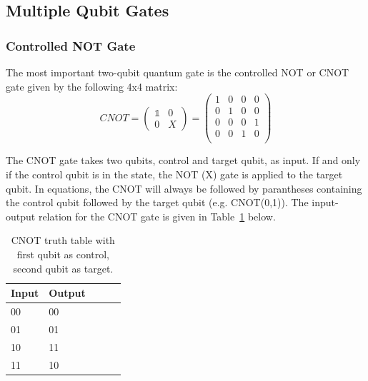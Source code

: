 

\subsection{Multiple Qubit Gates}
\label{subsubsec:multiqubitgates}

\subsubsection{Controlled NOT Gate}
\label{subsubsubsec:cnotgate}

The most important two-qubit quantum gate is the controlled NOT or CNOT gate given by the following 4x4 matrix:
\begin{equation}
CNOT = \begin{pmatrix}
 \mathbb{1} & 0 \\ 
 0 & X
 \end{pmatrix} = \begin{pmatrix}
 1 & 0 & 0 & 0 \\ 
 0 & 1 & 0 & 0 \\
 0 & 0 & 0 & 1 \\
 0 & 0 & 1 & 0 \\
 \end{pmatrix}
\end{equation}

The CNOT gate takes two qubits, control and target qubit, as input. If and only if the control qubit is in the \1 state, the NOT (X) gate is applied to the target qubit. In equations, the CNOT will always be followed by parantheses containing the control qubit followed by the target qubit (e.g. CNOT(0,1)). The input-output relation for the CNOT gate is given in Table~\ref{tab:cnottruthtable} below.

\begin{table}[ht!]
\begin{center}
\caption{CNOT truth table with first qubit as control, second qubit as target.}\vspace{1ex}
\label{tab:cnottruthtable}
\begin{tabular}{llccc}\hline
Input & Output \\ \hline
00 & 00 \\
01 & 01 \\
10 & 11 \\
11 & 10 \\ \hline
\end{tabular}
\end{center}
\end{table}


